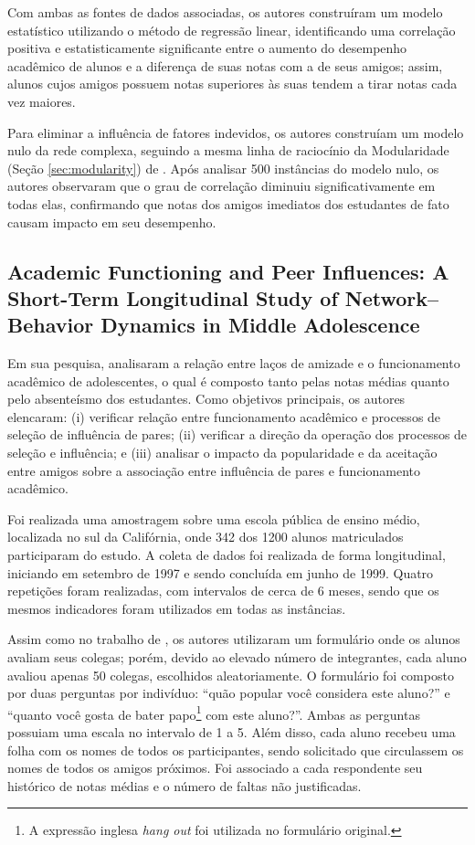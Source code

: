 Com ambas as fontes de dados associadas, os autores construíram um modelo estatístico utilizando o método de regressão linear, identificando uma correlação positiva e estatisticamente significante entre o aumento do desempenho acadêmico de alunos e a diferença de suas notas com a de seus amigos; assim, alunos cujos amigos possuem notas superiores às suas tendem a tirar notas cada vez maiores.

Para eliminar a influência de fatores indevidos, os autores construíam um modelo nulo da rede complexa, seguindo a mesma linha de raciocínio da Modularidade (Seção \ref{sec:modularity}) de . Após analisar 500 instâncias do modelo nulo, os autores observaram que o grau de correlação diminuiu significativamente em todas elas, confirmando que notas dos amigos imediatos dos estudantes de fato causam impacto em seu desempenho.

\subsection{Academic Functioning and Peer Influences: A Short-Term Longitudinal Study of Network--Behavior Dynamics in Middle Adolescence} \label{sec:rambaran}

Em sua pesquisa,  analisaram a relação entre laços de amizade e o funcionamento acadêmico de adolescentes, o qual é composto tanto pelas notas médias quanto pelo absenteísmo dos estudantes. Como objetivos principais, os autores elencaram: (i) verificar relação entre funcionamento acadêmico e processos de seleção de influência de pares; (ii) verificar a direção da operação dos processos de seleção e influência; e (iii) analisar o impacto da popularidade e da aceitação entre amigos sobre a associação entre influência de pares e funcionamento acadêmico.

Foi realizada uma amostragem sobre uma escola pública de ensino médio, localizada no sul da Califórnia, onde 342 dos 1200 alunos matriculados participaram do estudo. A coleta de dados foi realizada de forma longitudinal, iniciando em setembro de 1997 e sendo concluída em junho de 1999. Quatro repetições foram realizadas, com intervalos de cerca de 6 meses, sendo que os mesmos indicadores foram utilizados em todas as instâncias.

Assim como no trabalho de , os autores utilizaram um formulário onde os alunos avaliam seus colegas; porém, devido ao elevado número de integrantes, cada aluno avaliou apenas 50 colegas, escolhidos aleatoriamente. O formulário foi composto por duas perguntas por indivíduo: ``quão popular você considera este aluno?'' e ``quanto você gosta de bater papo\footnote{A expressão inglesa \textit{hang out} foi utilizada no formulário original.} com este aluno?''. Ambas as perguntas possuiam uma escala no intervalo de 1 a 5. Além disso, cada aluno recebeu uma folha com os nomes de todos os participantes, sendo solicitado que circulassem os nomes de todos os amigos próximos. Foi associado a cada respondente seu histórico de notas médias e o número de faltas não justificadas.

